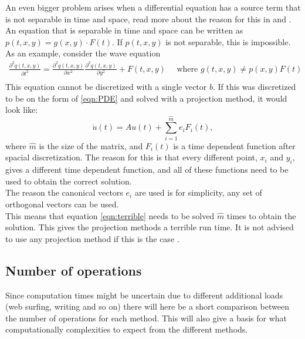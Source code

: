 An even bigger problem arises when a differential equation has a source term that is not separable in time and space, read more about the reason for this in \cite{elena} and \citep{min}. An equation that is separable in time and space can be written as $p(t,x,y) = g(x,y) \cdot F(t)$. If $p(t,x,y)$ is not separable, this is impossible. As an example, consider the wave equation
\begin{equation*}
\begin{aligned}
\frac{\partial^2 q(t,x,y)}{\partial t^2} = \frac{\partial^2 q(t,x,y)}{\partial x^2 } \frac{\partial^2 q(t,x,y)}{\partial y^2 } + F(t,x,y) \quad \text{ where } g(t,x,y) \neq p(x,y) F(t) \\
\end{aligned}
\end{equation*}
This equation cannot be discretized with a single vector $b$. If this was discretized to be on the form of \eqref{eqn:PDE} and solved with a projection method, it would look like:
\begin{equation*} \label{eqn:terrible}
\dot{u}(t) = A u(t) + \sum \limits_{i = 1}^{\hat{m}} e_i F_i(t),
\end{equation*}
where $\hat{m}$ is the size of the matrix, and $F_i(t)$ is a time dependent function after spacial discretization. The reason for this is that every different point, $x_i$ and $y_i$, gives a different time dependent function, and all of these functions need to be used to obtain the correct solution. \\
The reason the canonical vectors $e_i$ are used is for simplicity, any set of orthogonal vectors can be used. \\
This means that equation \eqref{eqn:terrible} needs to be solved $\hat{m}$ times to obtain the solution. This gives the projection methods a terrible run time. It is not advised  to use any projection method if this is the case \cite{min}.
\newpage


\subsection{Number of operations}%
Since computation times might be uncertain due to different additional loads (web surfing, writing and so on) there will here be a short comparison between the number of operations for each method. This will also give a basis for what computationally complexities to expect from the different methods.\\

